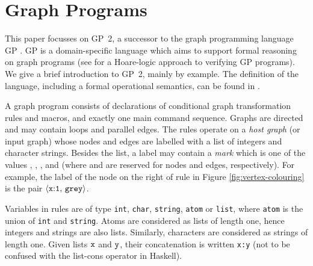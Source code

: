 \section{Graph Programs}
\label{sec:graph-programs}

This paper focusses on GP~2, a successor to the graph programming language GP \cite{Plump09a,Plump12a}.
GP is a domain-specific language which aims to support formal reasoning on graph programs (see \cite{Poskitt-Plump12a} for a Hoare-logic approach to verifying GP programs). We give a brief introduction to GP~2, mainly by example. The definition of the language, including a formal operational semantics, can be found in \cite{Plump12a}. 

A graph program consists of declarations of conditional graph transformation rules and macros, and exactly one main command sequence. Graphs are directed and may contain  loops and parallel edges. The rules operate on a \emph{host graph}\/ (or input graph) whose nodes and edges are labelled with a list of integers and character strings. Besides the list, a label may contain a \emph{mark}\/ which is one of the values , , ,  and  (where  and  are reserved for nodes and edges, respectively). For example, the label of the node on the right of rule  in Figure \ref{fig:vertex-colouring} is the pair $\langle\mathtt{x{:}1},\, \mathtt{grey}\rangle$.

Variables in rules are of type \texttt{int}, \texttt{char}, \texttt{string}, \texttt{atom} or \texttt{list}, where \texttt{atom} is the union of \texttt{int} and \texttt{string}. Atoms are considered as lists of length one, hence integers and strings are also lists. Similarly, characters are considered as strings of length one. Given lists $\mathtt{x}$ and $\mathtt{y}$, their concatenation is written \texttt{x:y} (not to be confused with the list-cons operator in Haskell). 

